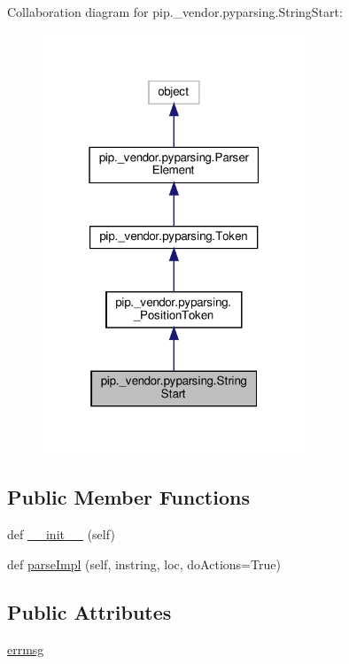 Collaboration diagram for pip.\+\_\+vendor.\+pyparsing.\+String\+Start\+:
\nopagebreak
\begin{figure}[H]
\begin{center}
\leavevmode
\includegraphics[width=223pt]{classpip_1_1__vendor_1_1pyparsing_1_1StringStart__coll__graph}
\end{center}
\end{figure}
\subsection*{Public Member Functions}
\begin{DoxyCompactItemize}
\item 
def \hyperlink{classpip_1_1__vendor_1_1pyparsing_1_1StringStart_a7cddb5149262b3ee3e08b98e55132dd6}{\+\_\+\+\_\+init\+\_\+\+\_\+} (self)
\item 
def \hyperlink{classpip_1_1__vendor_1_1pyparsing_1_1StringStart_a17e6f233bb8cd0a05e9b0c45e4013366}{parse\+Impl} (self, instring, loc, do\+Actions=True)
\end{DoxyCompactItemize}
\subsection*{Public Attributes}
\begin{DoxyCompactItemize}
\item 
\hyperlink{classpip_1_1__vendor_1_1pyparsing_1_1StringStart_a9a740533ebefc6b770c4030d94ad92a8}{errmsg}
\end{DoxyCompactItemize}
